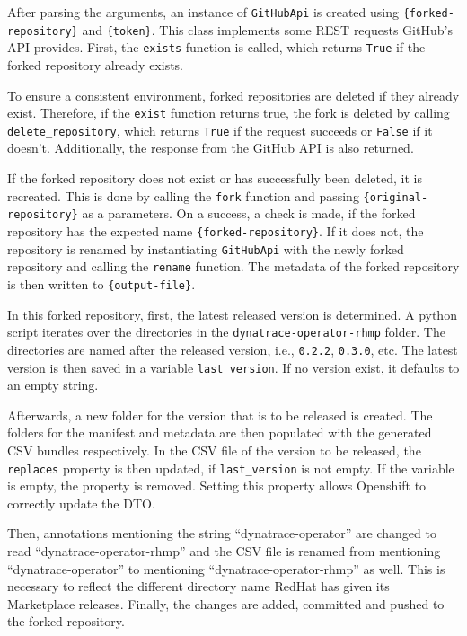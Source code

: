 After parsing the arguments, an instance of \verb|GitHubApi| is created using \verb|{forked-repository}| and \verb|{token}|.
This class implements some REST requests GitHub's API provides.
First, the \verb|exists| function is called, which returns \verb|True| if the forked repository already exists.

\pagebreak

To ensure a consistent environment, forked repositories are deleted if they already exist.
Therefore, if the \verb|exist| function returns true, the fork is deleted by calling \verb|delete_repository|, which returns \verb|True| if the request succeeds or \verb|False| if it doesn't.
Additionally, the response from the GitHub API is also returned.

If the forked repository does not exist or has successfully been deleted, it is recreated.
This is done by calling the \verb|fork| function and passing \verb|{original-repository}| as a parameters.
On a success, a check is made, if the forked repository has the expected name \verb|{forked-repository}|.
If it does not, the repository is renamed by instantiating \verb|GitHubApi| with the newly forked repository and calling the \verb|rename| function.
The metadata of the forked repository is then written to \verb|{output-file}|.

In this forked repository, first, the latest released version is determined.
A python script iterates over the directories in the \verb|dynatrace-operator-rhmp| folder.
The directories are named after the released version, i.e., \verb|0.2.2|, \verb|0.3.0|, etc.
The latest version is then saved in a variable \verb|last_version|.
If no version exist, it defaults to an empty string.

Afterwards, a new folder for the version that is to be released is created.
The folders for the manifest and metadata are then populated with the generated CSV bundles respectively.
In the CSV file of the version to be released, the \verb|replaces| property is then updated, if \verb|last_version| is not empty.
If the variable is empty, the property is removed.
Setting this property allows Openshift to correctly update the DTO.

Then, annotations mentioning the string ``dynatrace-operator'' are changed to read ``dynatrace-operator-rhmp'' and the CSV file is renamed from  mentioning ``dynatrace-operator'' to mentioning ``dynatrace-operator-rhmp'' as well.
This is necessary to reflect the different directory name RedHat has given its Marketplace releases.
Finally, the changes are added, committed and pushed to the forked repository.
